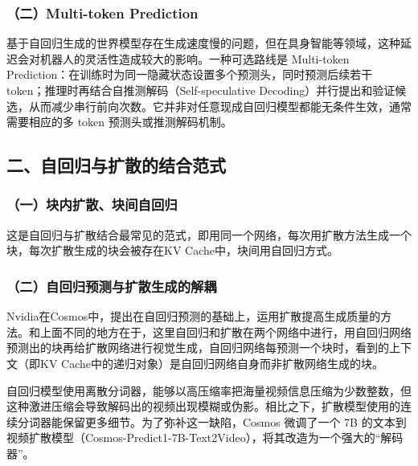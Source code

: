\hypertarget{ux4e8cmulti-token-prediction}{%
\subsubsection{（二）Multi-token Prediction}\label{ux4e8cmulti-token-prediction}}

基于自回归生成的世界模型存在生成速度慢的问题，但在具身智能等领域，这种延迟会对机器人的灵活性造成较大的影响。一种可选路线是 Multi-token Prediction：在训练时为同一隐藏状态设置多个预测头，同时预测后续若干 token；推理时再结合自推测解码（Self-speculative Decoding）并行提出和验证候选，从而减少串行前向次数。它并非对任意现成自回归模型都能无条件生效，通常需要相应的多 token 预测头或推测解码机制。

\hypertarget{ux4e8cux81eaux56deux5f52ux4e0eux6269ux6563ux7684ux7ed3ux5408ux8303ux5f0f}{%
\subsection{二、自回归与扩散的结合范式}\label{ux4e8cux81eaux56deux5f52ux4e0eux6269ux6563ux7684ux7ed3ux5408ux8303ux5f0f}}

\hypertarget{ux4e00ux5757ux5185ux6269ux6563ux5757ux95f4ux81eaux56deux5f52}{%
\subsubsection{（一）块内扩散、块间自回归}\label{ux4e00ux5757ux5185ux6269ux6563ux5757ux95f4ux81eaux56deux5f52}}

这是自回归与扩散结合最常见的范式，即用同一个网络，每次用扩散方法生成一个块，每次扩散生成的块会被存在KV Cache中，块间用自回归方式。

\hypertarget{ux4e8cux81eaux56deux5f52ux9884ux6d4bux4e0eux6269ux6563ux751fux6210ux7684ux89e3ux8026}{%
\subsubsection{（二）自回归预测与扩散生成的解耦}\label{ux4e8cux81eaux56deux5f52ux9884ux6d4bux4e0eux6269ux6563ux751fux6210ux7684ux89e3ux8026}}

Nvidia在Cosmos中，提出在自回归预测的基础上，运用扩散提高生成质量的方法。和上面不同的地方在于，这里自回归和扩散在两个网络中进行，用自回归网络预测出的块再给扩散网络进行视觉生成，自回归网络每预测一个块时，看到的上下文（即KV Cache中的递归对象）是自回归网络自身而非扩散网络生成的块。

自回归模型使用离散分词器，能够以高压缩率把海量视频信息压缩为少数整数，但这种激进压缩会导致解码出的视频出现模糊或伪影。相比之下，扩散模型使用的连续分词器能保留更多细节。为了弥补这一缺陷，Cosmos 微调了一个 7B 的文本到视频扩散模型（Cosmos-Predict1-7B-Text2Video），将其改造为一个强大的``解码器''。

